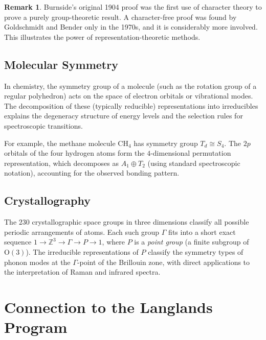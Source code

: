 \documentclass[12pt,a4paper]{amsart}
\theoremstyle{definition}
\newtheorem{remark}[theorem]{Remark}
\begin{document}
\begin{remark}
Burnside's original 1904 proof was the first use of character theory to prove a
purely group-theoretic result.  A character-free proof was found by Goldschmidt
and Bender only in the 1970s, and it is considerably more involved.  This
illustrates the power of representation-theoretic methods.
\end{remark}

\subsection{Molecular Symmetry}

In chemistry, the symmetry group of a molecule (such as the rotation group of a
regular polyhedron) acts on the space of electron orbitals or vibrational modes.
The decomposition of these (typically reducible) representations into irreducibles
explains the degeneracy structure of energy levels and the selection rules for
spectroscopic transitions.

For example, the methane molecule $\mathrm{CH}_4$ has symmetry group $T_d \cong
S_4$.  The $2p$ orbitals of the four hydrogen atoms form the $4$-dimensional
permutation representation, which decomposes as $A_1 \oplus T_2$ (using
standard spectroscopic notation), accounting for the observed bonding pattern.

\subsection{Crystallography}

The $230$ crystallographic space groups in three dimensions classify all possible
periodic arrangements of atoms.  Each such group $\Gamma$ fits into a short exact
sequence $1 \to \mathbb{Z}^3 \to \Gamma \to P \to 1$, where $P$ is a
\emph{point group} (a finite subgroup of $\mathrm{O}(3)$).  The irreducible
representations of $P$ classify the symmetry types of phonon modes at the
$\Gamma$-point of the Brillouin zone, with direct applications to the
interpretation of Raman and infrared spectra.

\section{Connection to the Langlands Program}
\label{sec:langlands}
\end{document}
